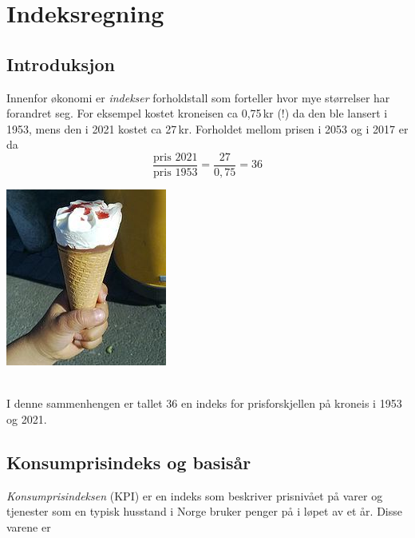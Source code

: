 




\newpage
\section{Indeksregning}
\subsection{Introduksjon}
\parbox{0.6\linewidth}{Innenfor økonomi er \textit{indekser} forholdstall som forteller hvor mye størrelser har forandret seg. For eksempel kostet kroneisen ca 0,75\,kr (!) da den ble lansert i 1953, mens den i 2021 kostet ca 27\,kr. Forholdet mellom prisen i 2053 og i 2017 er da
	\[ \frac{\text{pris 2021}}{\text{pris 1953}}=\frac{27}{0,75}= 36 \]
}
\parbox[r]{0.3\linewidth}{\includegraphics[scale=2]{kr}}\\[2pt]
I denne sammenhengen  er tallet 36 en indeks for prisforskjellen på kroneis i 1953 og 2021.

\subsection{Konsumprisindeks og basisår}
\textit{Konsumprisindeksen} (KPI) er en indeks som beskriver prisnivået på varer og tjenester som en typisk husstand i Norge bruker penger på i løpet av et år. Disse varene er \vs

